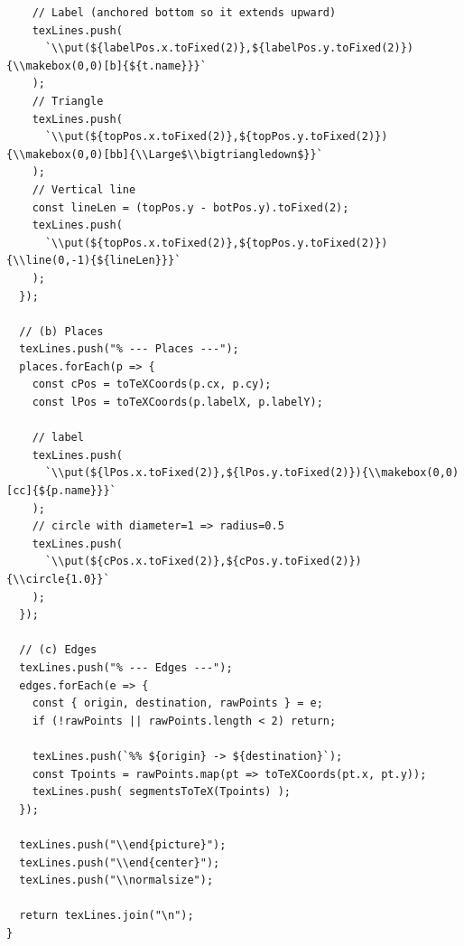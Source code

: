 \begin{verbatim}
    // Label (anchored bottom so it extends upward)
    texLines.push(
      `\\put(${labelPos.x.toFixed(2)},${labelPos.y.toFixed(2)}){\\makebox(0,0)[b]{${t.name}}}`
    );
    // Triangle
    texLines.push(
      `\\put(${topPos.x.toFixed(2)},${topPos.y.toFixed(2)}){\\makebox(0,0)[bb]{\\Large$\\bigtriangledown$}}`
    );
    // Vertical line
    const lineLen = (topPos.y - botPos.y).toFixed(2);
    texLines.push(
      `\\put(${topPos.x.toFixed(2)},${topPos.y.toFixed(2)}){\\line(0,-1){${lineLen}}}`
    );
  });

  // (b) Places
  texLines.push("% --- Places ---");
  places.forEach(p => {
    const cPos = toTeXCoords(p.cx, p.cy);
    const lPos = toTeXCoords(p.labelX, p.labelY);

    // label
    texLines.push(
      `\\put(${lPos.x.toFixed(2)},${lPos.y.toFixed(2)}){\\makebox(0,0)[cc]{${p.name}}}`
    );
    // circle with diameter=1 => radius=0.5
    texLines.push(
      `\\put(${cPos.x.toFixed(2)},${cPos.y.toFixed(2)}){\\circle{1.0}}`
    );
  });

  // (c) Edges
  texLines.push("% --- Edges ---");
  edges.forEach(e => {
    const { origin, destination, rawPoints } = e;
    if (!rawPoints || rawPoints.length < 2) return;

    texLines.push(`%% ${origin} -> ${destination}`);
    const Tpoints = rawPoints.map(pt => toTeXCoords(pt.x, pt.y));
    texLines.push( segmentsToTeX(Tpoints) );
  });

  texLines.push("\\end{picture}");
  texLines.push("\\end{center}");
  texLines.push("\\normalsize");

  return texLines.join("\n");
}
\end{verbatim}